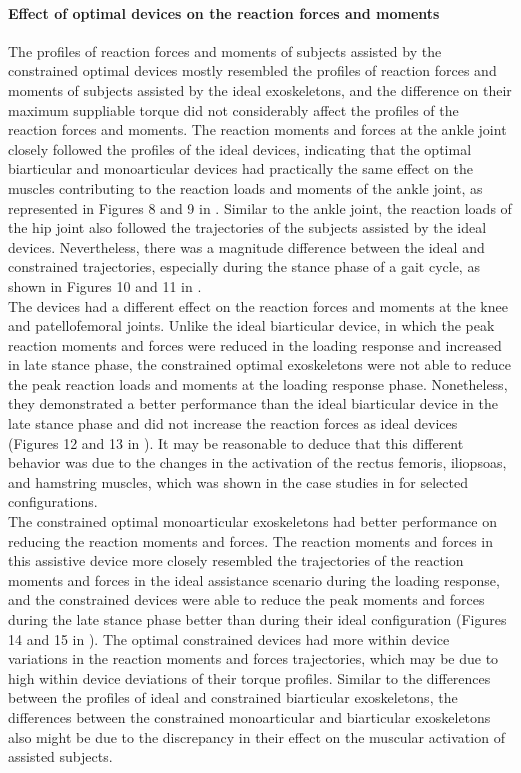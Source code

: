 \documentclass[10pt,letterpaper]{article}
\begin{document}
\paragraph{Effect of optimal devices on the reaction forces and moments} The profiles of reaction forces and moments of subjects assisted by the constrained optimal devices mostly resembled the profiles of reaction forces and moments of subjects assisted by the ideal exoskeletons, and the difference on their maximum suppliable torque did not considerably affect the profiles of the reaction forces and moments. The reaction moments and forces at the ankle joint closely followed the profiles of the ideal devices, indicating that the optimal biarticular and monoarticular devices had practically the same effect on the muscles contributing to the reaction loads and moments of the ankle joint, as represented in Figures 8 and 9 in .  Similar to the ankle joint, the reaction loads of the hip joint also followed the trajectories of the subjects assisted by the ideal devices. Nevertheless, there was a magnitude difference between the ideal and constrained trajectories, especially during the stance phase of a gait cycle, as shown in Figures 10 and 11 in .\\
The devices had a different effect on the reaction forces and moments at the knee and patellofemoral joints. Unlike the ideal biarticular device, in which the peak reaction moments and forces were reduced in the loading response and increased in late stance phase, the constrained optimal exoskeletons were not able to reduce the peak reaction loads and moments at the loading response phase. Nonetheless, they demonstrated a better performance than the ideal biarticular device in the late stance phase and did not increase the reaction forces as ideal devices (Figures 12 and 13 in ). It may be reasonable to deduce that this different behavior was due to the changes in the activation of the rectus femoris, iliopsoas, and hamstring muscles, which was shown in the case studies in  for selected configurations.\\
The constrained optimal monoarticular exoskeletons had better performance on reducing the reaction moments and forces. The reaction moments and forces in this assistive device more closely resembled the trajectories of the reaction moments and forces in the ideal assistance scenario during the loading response, and the constrained devices were able to reduce the peak moments and forces during the late stance phase better than during their ideal configuration (Figures 14 and 15 in ). The optimal constrained devices had more within device variations in the reaction moments and forces trajectories, which may be due to high within device deviations of their torque profiles. Similar to the differences between the profiles of ideal and constrained biarticular exoskeletons, the differences between the constrained monoarticular and biarticular exoskeletons also might be due to the discrepancy in their effect on the muscular activation of assisted subjects.
\end{document}
